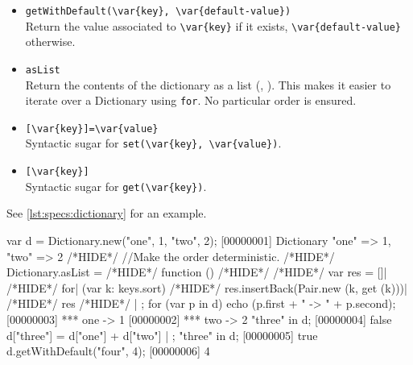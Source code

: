 \begin{itemize}
\item \lstinline|getWithDefault(\var{key}, \var{default-value})|\\
  Return the value associated to  \lstinline|\var{key}| if it exists,
  \lstinline|\var{default-value}| otherwise.

\item \lstinline|asList|\\
  Return the contents of the dictionary as a  list
  (, ).  This makes it easier to iterate over a
  Dictionary using \lstinline|for|.  No particular order is ensured.

\item \lstinline|[\var{key}]=\var{value}|\\
  Syntactic sugar for \lstinline|set(\var{key}, \var{value})|.

\item \lstinline|[\var{key}]|\\
  Syntactic sugar for \lstinline|get(\var{key})|.
\end{itemize}

See \autoref{lst:specs:dictionary} for an example.

\begin{urbiscript}[caption=Dictionaries, label=lst:specs:dictionary]
var d = Dictionary.new("one", 1, "two", 2);
[00000001] Dictionary {"one" => 1, "two" => 2}
/*HIDE*/ //Make the order deterministic.
/*HIDE*/ Dictionary.asList =
/*HIDE*/ function ()
/*HIDE*/ {
/*HIDE*/   var res = []|
/*HIDE*/   for| (var k: keys.sort)
/*HIDE*/     res.insertBack(Pair.new (k, get (k)))|
/*HIDE*/   res
/*HIDE*/ } | {};
for (var p in d)
  echo (p.first + " -> " + p.second);
[00000003] *** one -> 1
[00000002] *** two -> 2
"three" in d;
[00000004] false
d["three"] = d["one"] + d["two"] | {};
"three" in d;
[00000005] true
d.getWithDefault("four", 4);
[00000006] 4
\end{urbiscript}

